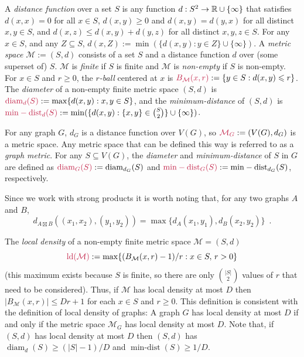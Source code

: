\documentclass{patmorin}
\makeatletter
\renewcommand{\ge}{\geqslant}
\renewcommand{\le}{\leqslant}
\renewcommand{\geq}{\geqslant}
\newcommand{\pat}[1]{\textcolor{Blue}{Pat: #1}}
\newcommand{\gwen}[1]{\textcolor{Purple}{Gwen: #1}}
\newcommand{\defin}[1]{\emph{\textcolor{brightmaroon}{#1}}}
\def\mathcolor#1#{\@mathcolor{#1}}
\def\@mathcolor#1#2#3{%
  \protect\leavevmode
  \begingroup
    \color#1{#2}#3%
  \endgroup
}
\newcommand{\mathdefin}[1]{\mathcolor{brightmaroon}{#1}}
\DeclareMathOperator{\diam}{diam}
\DeclareMathOperator{\mindist}{min-dist}
\DeclareMathOperator{\ld}{ld}
\makeatother
\begin{document}
A \defin{distance function} over a set $S$ is any function $d:S^2\to\mathbb{R}\cup\{\infty\}$ that satisfies $d(x,x)=0$ for all $x\in S$, $d(x,y)\ge 0$ and $d(x,y)=d(y,x)$ for all distinct $x,y\in S$, and $d(x,z) \le d(x,y)+d(y,z)$ for all distinct $x,y,z\in S$.  For any $x\in S$, and any $Z\subseteq S$, $d(x,Z):=\min(\{d(x,y):y\in Z\}\cup\{\infty\})$.  A \defin{metric space} $\mathcal{M}:=(S,d)$ consists of a set $S$ and a distance function $d$ over (some superset of) $S$.
$\mathcal{M}$ is \defin{finite} if $S$ is finite and $\mathcal{M}$ is \defin{non-empty} if $S$ is non-empty.  For $x\in S$ and $r\geq 0$, the \defin{$r$-ball} centered at $x$ is $\mathdefin{B_{\mathcal{M}}(x,r)}:=\{y\in S:d(x,y)\le r\}$.  The \defin{diameter} of a non-empty finite metric space $(S,d)$ is $\mathdefin{\diam_d(S)}:=\max\{d(x,y):x,y\in S\}$, and the
\defin{minimum-distance} of $(S,d)$ is $\mathdefin{\mindist_d(S)}:=\min(\{d(x,y): \{x,y\}\in\binom{S}{2}\}\cup\{\infty\})$.

For any graph $G$, $d_G$ is a distance function over $V(G)$, so $\mathdefin{\mathcal{M}_G}:=(V(G),d_G)$ is a metric space. Any metric space that can be defined this way is referred to as a \defin{graph metric}. For any $S\subseteq V(G)$, the \defin{diameter} and \defin{minimum-distance} of $S$ in $G$ are defined as $\mathdefin{\diam_G(S)}:=\diam_{d_G}(S)$ and $\mathdefin{\mindist_G(S)}:=\mindist_{d_G}(S)$, respectively.


Since we work with strong products it is worth noting that, for any two graphs $A$ and $B$,
\[
  d_{A\boxtimes B}((x_1,x_2),(y_1,y_2))=\max\{d_A(x_1,y_1),d_B(x_2,y_2)\} \enspace .
\]

The \defin{local density} of a non-empty finite metric space  $\mathcal{M}=(S,d)$
\[
  \mathdefin{\ld(\mathcal{M})}:=\max\{(B_{\mathcal{M}}(x,r)-1)/r:x\in S,\, r>0\}
\]
(this maximum exists because $S$ is finite, so there are only $\binom{|S|}{2}$ values of $r$ that need to be considered).
Thus, if $\mathcal{M}$ has local density at most $D$ then $|B_{\mathcal{M}}(x,r)|\le Dr+1$ for each $x\in S$ and $r\ge 0$.
This definition is consistent with the definition of local density of graphs:  A graph $G$ has local density at most $D$ if and only if the metric space $\mathcal{M}_G$ has local density at most $D$.  Note that, if $(S,d)$ has local density at most $D$ then $(S,d)$ has $\diam_d(S)\ge (|S|-1)/D$ and $\mindist(S)\ge 1/D$.
\end{document}
